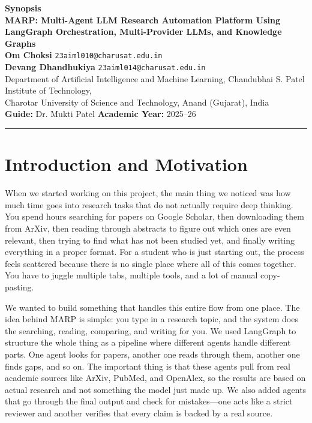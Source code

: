 \documentclass[12pt,a4paper]{article}
\begin{document}
\begin{center}
  {\Large \textbf{Synopsis}}\\[0.5em]
  {\large \textbf{MARP: Multi-Agent LLM Research Automation Platform
  Using LangGraph Orchestration, Multi-Provider LLMs, and Knowledge Graphs}}\\[0.7em]
  \normalsize
  \textbf{Om Choksi} \quad \texttt{23aiml010@charusat.edu.in}\\[0.2em]
  \textbf{Devang Dhandhukiya} \quad \texttt{23aiml014@charusat.edu.in}\\[0.3em]
  \small
  Department of Artificial Intelligence and Machine Learning,
  Chandubhai S. Patel Institute of Technology,\\
  Charotar University of Science and Technology, Anand (Gujarat), India\\[0.3em]
  \normalsize
  \textbf{Guide:} Dr. Mukti Patel \qquad \textbf{Academic Year:} 2025--26
\end{center}

\vspace{0.3em}
\hrule
\vspace{0.6em}

\section{Introduction and Motivation}

When we started working on this project, the main thing we noticed was how much time goes into research tasks that do not actually require deep thinking. You spend hours searching for papers on Google Scholar, then downloading them from ArXiv, then reading through abstracts to figure out which ones are even relevant, then trying to find what has not been studied yet, and finally writing everything in a proper format. For a student who is just starting out, the process feels scattered because there is no single place where all of this comes together. You have to juggle multiple tabs, multiple tools, and a lot of manual copy-pasting.

We wanted to build something that handles this entire flow from one place. The idea behind MARP is simple: you type in a research topic, and the system does the searching, reading, comparing, and writing for you. We used LangGraph to structure the whole thing as a pipeline where different agents handle different parts. One agent looks for papers, another one reads through them, another one finds gaps, and so on. The important thing is that these agents pull from real academic sources like ArXiv, PubMed, and OpenAlex, so the results are based on actual research and not something the model just made up. We also added agents that go through the final output and check for mistakes---one acts like a strict reviewer and another verifies that every claim is backed by a real source.
\end{document}
